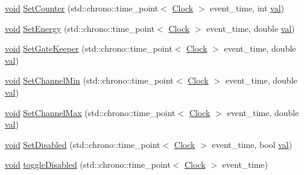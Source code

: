 \begin{DoxyCompactItemize}
\item 
\mbox{\hyperlink{glad_8h_a950fc91edb4504f62f1c577bf4727c29}{void}} \mbox{\hyperlink{class_neuron_a92f942f6f0bd783c39bb550cf4bb8fd0}{Set\+Counter}} (std\+::chrono\+::time\+\_\+point$<$ \mbox{\hyperlink{universe_8h_a0ef8d951d1ca5ab3cfaf7ab4c7a6fd80}{Clock}} $>$ event\+\_\+time, int \mbox{\hyperlink{glad_8h_a26942fd2ed566ef553eae82d2c109c8f}{val}})
\item 
\mbox{\hyperlink{glad_8h_a950fc91edb4504f62f1c577bf4727c29}{void}} \mbox{\hyperlink{class_neuron_a5efa690ce4d8ff2f8dfb1fbfd84c5279}{Set\+Energy}} (std\+::chrono\+::time\+\_\+point$<$ \mbox{\hyperlink{universe_8h_a0ef8d951d1ca5ab3cfaf7ab4c7a6fd80}{Clock}} $>$ event\+\_\+time, double \mbox{\hyperlink{glad_8h_a26942fd2ed566ef553eae82d2c109c8f}{val}})
\item 
\mbox{\hyperlink{glad_8h_a950fc91edb4504f62f1c577bf4727c29}{void}} \mbox{\hyperlink{class_neuron_a492f597021faf1b74942bc75364c3c22}{Set\+Gate\+Keeper}} (std\+::chrono\+::time\+\_\+point$<$ \mbox{\hyperlink{universe_8h_a0ef8d951d1ca5ab3cfaf7ab4c7a6fd80}{Clock}} $>$ event\+\_\+time, double \mbox{\hyperlink{glad_8h_a26942fd2ed566ef553eae82d2c109c8f}{val}})
\item 
\mbox{\hyperlink{glad_8h_a950fc91edb4504f62f1c577bf4727c29}{void}} \mbox{\hyperlink{class_neuron_ae463ad8173c63e7970a5f4594667d481}{Set\+Channel\+Min}} (std\+::chrono\+::time\+\_\+point$<$ \mbox{\hyperlink{universe_8h_a0ef8d951d1ca5ab3cfaf7ab4c7a6fd80}{Clock}} $>$ event\+\_\+time, double \mbox{\hyperlink{glad_8h_a26942fd2ed566ef553eae82d2c109c8f}{val}})
\item 
\mbox{\hyperlink{glad_8h_a950fc91edb4504f62f1c577bf4727c29}{void}} \mbox{\hyperlink{class_neuron_aed1ba99e24b905cd91a519c33b5a62b0}{Set\+Channel\+Max}} (std\+::chrono\+::time\+\_\+point$<$ \mbox{\hyperlink{universe_8h_a0ef8d951d1ca5ab3cfaf7ab4c7a6fd80}{Clock}} $>$ event\+\_\+time, double \mbox{\hyperlink{glad_8h_a26942fd2ed566ef553eae82d2c109c8f}{val}})
\item 
\mbox{\hyperlink{glad_8h_a950fc91edb4504f62f1c577bf4727c29}{void}} \mbox{\hyperlink{class_neuron_af9ad96e27f7692e9e328d90e4c96977a}{Set\+Disabled}} (std\+::chrono\+::time\+\_\+point$<$ \mbox{\hyperlink{universe_8h_a0ef8d951d1ca5ab3cfaf7ab4c7a6fd80}{Clock}} $>$ event\+\_\+time, bool \mbox{\hyperlink{glad_8h_a26942fd2ed566ef553eae82d2c109c8f}{val}})
\item 
\mbox{\hyperlink{glad_8h_a950fc91edb4504f62f1c577bf4727c29}{void}} \mbox{\hyperlink{class_neuron_a32fe82aa21f8a68392d696eea3a34c99}{toggle\+Disabled}} (std\+::chrono\+::time\+\_\+point$<$ \mbox{\hyperlink{universe_8h_a0ef8d951d1ca5ab3cfaf7ab4c7a6fd80}{Clock}} $>$ event\+\_\+time)

\end{DoxyCompactItemize}
